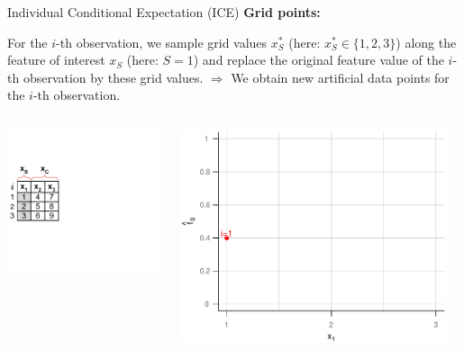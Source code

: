 \documentclass[11pt,compress,t,notes=noshow, xcolor=table]{beamer}
\begin{document}
\begin{vbframe}{Individual Conditional Expectation (ICE)}
\textbf{Grid points:}

For the $i$-th observation, we sample grid values $x_S^*$ (here: $x_S^* \in \{1, 2, 3\}$) along the feature of interest $x_S$ (here: $S = 1$) and replace the original feature value of the $i$-th observation by these grid values. \newline
$\Rightarrow$ We obtain new artificial data points for the $i$-th observation.


\framebreak

\begin{columns}[T]
\begin{column}{0.45\textwidth}
\includegraphics[page=3, trim=0cm 0.35cm 0.85cm 0.35cm, width=\textwidth]{figure_man/ice_plot_demo}
\end{column}
\begin{column}{0.55\textwidth}
\includegraphics[page=1, width=0.95\textwidth]{figure_man/ICE}
\end{column}
\end{columns}
\vspace*{\topsep}


\end{vbframe}
\end{document}
